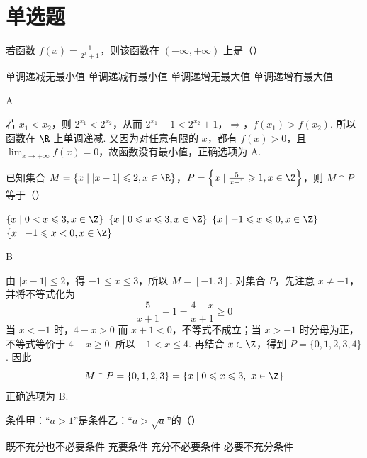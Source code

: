 \section{单选题}
\begin{problem}
若函数 \( f(x) = \frac{1}{2^x + 1} \)，则该函数在 \((- \infty, + \infty)\) 上是（\quad）

\choices
    {单调递减无最小值}
    {单调递减有最小值}
    {单调递增无最大值}
    {单调递增有最大值}
\end{problem}

\begin{answer}
A
\end{answer}

\begin{solution}
若 \(x_1<x_2\)，则 \(2^{x_1}<2^{x_2}\)，从而
\(2^{x_1}+1<2^{x_2}+1\)，\(\Longrightarrow\)，\(f(x_1)>f(x_2)\).
所以函数在 \(\R\) 上单调递减. 又因为对任意有限的 \(x\)，都有 \(f(x)>0\)，且 \(\displaystyle\lim_{x\to+\infty}f(x)=0\)，故函数没有最小值，正确选项为 A.
\end{solution}

\begin{problem}
已知集合 \(M = \{x \mid |x - 1| \leqslant 2, x \in \R\}\)，\(P = \left\{x \mid \frac{5}{x + 1} \geqslant 1, x \in \Z\right\}\)，则 \(M \cap P\) 等于（\quad）

\choices
    {\(\{x\mid 0 < x\leqslant 3,x\in \Z\}\)}
    {\(\{x\mid 0\leqslant x\leqslant 3,x\in \Z\}\)}
    {\(\{x\mid -1\leqslant x\leqslant 0,x\in \Z\}\)}
    {\(\{x\mid -1\leqslant x < 0,x\in \Z\}\)}
\end{problem}

\begin{answer}
B
\end{answer}

\begin{solution}
由 \(|x-1|\leqslant2\)，得 \(-1\leqslant x\leqslant3\)，所以 \(M=[-1,3]\). 对集合 \(P\)，先注意 \(x\neq-1\)，并将不等式化为
\[
\frac{5}{x+1}-1=\frac{4-x}{x+1}\geqslant0
\]
当 \(x<-1\) 时，\(4-x>0\) 而 \(x+1<0\)，不等式不成立；当 \(x>-1\) 时分母为正，不等式等价于 \(4-x\geqslant0\). 所以 \(-1<x\leqslant4\). 再结合 \(x\in\Z\)，得到 \(P=\{0,1,2,3,4\}\). 因此
\[
M\cap P=\{0,1,2,3\}=\{x\mid0\leqslant x\leqslant3,\ x\in\Z\}
\]
正确选项为 B.
\end{solution}

\begin{problem}
条件甲：“\(a > 1\)”是条件乙：“\(a > \sqrt{a}\)”的（\quad）

\choices
    {既不充分也不必要条件}
    {充要条件}
    {充分不必要条件}
    {必要不充分条件}
\end{problem}

